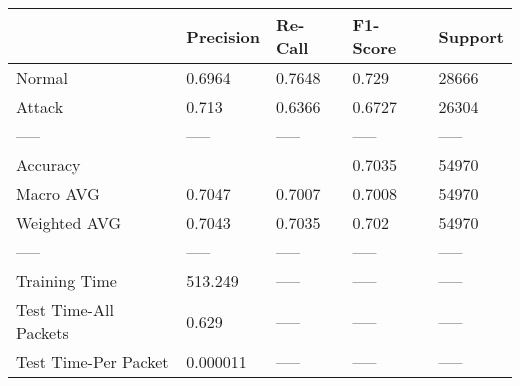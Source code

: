 \begin{tabular}{lllll}
\toprule
{} & Precision & Re-Call & F1-Score & Support \\
\midrule
Normal                &    0.6964 &  0.7648 &    0.729 &   28666 \\
Attack                &     0.713 &  0.6366 &   0.6727 &   26304 \\
-----                 &     ----- &   ----- &    ----- &   ----- \\
Accuracy              &           &         &   0.7035 &   54970 \\
Macro AVG             &    0.7047 &  0.7007 &   0.7008 &   54970 \\
Weighted AVG          &    0.7043 &  0.7035 &    0.702 &   54970 \\
-----                 &     ----- &   ----- &    ----- &   ----- \\
Training Time         &   513.249 &   ----- &    ----- &   ----- \\
Test Time-All Packets &     0.629 &   ----- &    ----- &   ----- \\
Test Time-Per Packet  &  0.000011 &   ----- &    ----- &   ----- \\
\bottomrule
\end{tabular}
